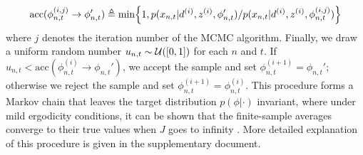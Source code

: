 %
\begin{align}
  \text{acc}(\phi_{n,t}^{(i,j)} \rightarrow \phi_{n,t}' ) \triangleq \min \Bigl\{1, {p(x_{n,t}|d^{(i)},z^{(i)},\phi'_{n,t})}/{p(x_{n,t}|d^{(i)},z^{(i)},\phi_{n,t}^{(i,j)})} \Bigr\} \label{eqn:mcmc_acc}
\end{align}
%
where $j$ denotes the iteration number of the MCMC algorithm. 
Finally, we draw a uniform random number $u_{n,t} \sim {\cal U}([0, 1])$ for each $n$ and $t$. If $u_{n,t} < \text{acc}(\phi_{n,t}^{(i)} \rightarrow \phi_{n,t}')$, we accept the sample and set $\phi_{n,t}^{(i+1)} = \phi_{n,t}'$; otherwise we reject the sample and set $\phi_{n,t}^{(i+1)} = \phi_{n,t}^{(i)}$. This procedure forms a Markov chain that leaves the target distribution $p(\phi|\cdot)$ invariant, where under mild ergodicity conditions, it can be shown that the finite-sample averages converge to their true values when $J$ goes to infinity \cite{Liu2008}. More detailed explanation of this procedure is given in the supplementary document.

%

%

